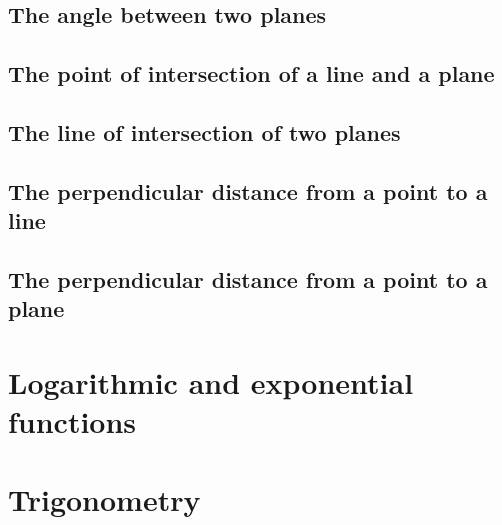 \subsection{The angle between two planes}


\subsection{The point of intersection of a line and a plane}
\subsection{The line of intersection of two planes}


\subsection{The perpendicular distance from a point to a line}




\subsection{The perpendicular distance from a point to a plane}
   












\section{Logarithmic and exponential functions}

\section{Trigonometry}




